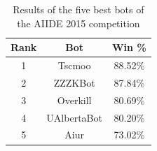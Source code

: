 \documentclass{llncs}
\begin{document}
\begin{table}[!t]
\caption{Results of the five best bots of the AIIDE 2015 competition}
\label{tab:aiide2015}
\centering
\begin{tabular}{|c|c|c|}
\hline
{\bfseries Rank} & {\bfseries Bot} & {\bfseries Win \%} \\
\hline
1 & Tscmoo & 88.52\% \\
2 & ZZZKBot & 87.84\% \\
3 & Overkill & 80.69\% \\
4 & UAlbertaBot & 80.20\% \\
5 & Aiur & 73.02\% \\
\hline
\end{tabular}
\end{table}


\end{document}
